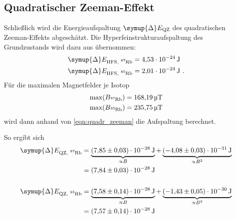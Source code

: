\subsection{Quadratischer Zeeman-Effekt}
Schließlich wird die Energieaufspaltung $\symup{\Delta}E_\text{QZ}$ des quadratischen Zeeman-Effekts abgeschätzt.
Die Hyperfeinstrukturaufspaltung des Grundzustands wird dazu aus \cite{versuchsanleitung} übernommen:
\begin{align*}
    \symup{\Delta}E_\text{HFS, \Rb{87}} &= \SI{4.53E-24}{\joule} \\
    \symup{\Delta}E_\text{HFS, \Rb{85}} &= \SI{2.01E-24}{\joule} \ .
\end{align*}
Für die maximalen Magnetfelder je Isotop
\begin{align*}
    \max(B_{\Rb{87}}) &= \SI{168.19}{\micro\tesla} \\
    \max(B_{\Rb{85}}) &= \SI{235.75}{\micro\tesla} \\
\end{align*}
wird dann anhand von \autoref{eqn:quadr_zeeman} die Aufspaltung berechnet.

So ergibt sich
\begin{align*}
    \symup{\Delta}E_\text{QZ, \Rb{87}} &=
        \underbrace{\SI{7.85(03)E-28}{\joule}}_{\propto B} +
        \underbrace{\SI{-4.08(03)E-31}{\joule}}_{\propto B^2} \\
        &= \SI{7.84(03)E-28}{\joule}
    \\
    \\
    \symup{\Delta}E_\text{QZ, \Rb{85}} &=
        \underbrace{\SI{7.58(14)E-28}{\joule}}_{\propto B} +
        \underbrace{\SI{-1.43(05)E-30}{\joule}}_{\propto B^2} \\
        &= \SI{7.57(14)E-28}{\joule}
\end{align*}
